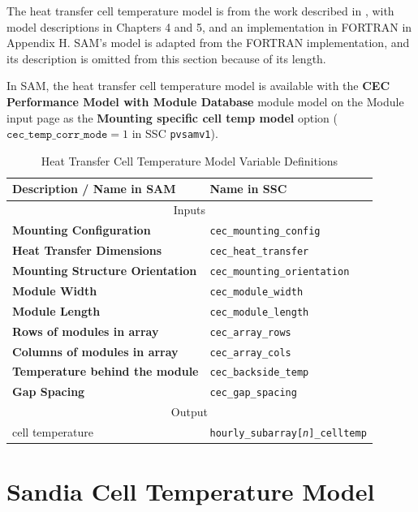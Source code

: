 \documentclass[12pt,letterpaper]{article}
\begin{document}
The heat transfer cell temperature model is from the work described in \citet{neises2011}, with model descriptions in Chapters 4 and 5, and an implementation in FORTRAN in Appendix H. SAM's model is adapted from the FORTRAN implementation, and its description is omitted from this section because of its length.

In SAM, the heat transfer cell temperature model is available with the \textbf{CEC Performance Model with Module Database} module model on the Module input page as the \textbf{Mounting specific cell temp model} option ($\mathtt{cec\_temp\_corr\_mode}=1$ in SSC \texttt{pvsamv1}).

\begin{table}
\begin{center}
\caption{Heat Transfer Cell Temperature Model Variable Definitions}
\begin{tabular}{ll}
\midrule
Description / \textbf{Name in SAM} & Name in SSC \\
\midrule
\multicolumn{2}{c}{Inputs}\\
\textbf{Mounting Configuration} & \texttt{cec\_mounting\_config} \\ 
\textbf{Heat Transfer Dimensions} & \texttt{cec\_heat\_transfer} \\ 
\textbf{Mounting Structure Orientation} & \texttt{cec\_mounting\_orientation} \\ 
\textbf{Module Width} & \texttt{cec\_module\_width} \\ 
\textbf{Module Length} & \texttt{cec\_module\_length} \\ 
\textbf{Rows of modules in array} & \texttt{cec\_array\_rows} \\ 
\textbf{Columns of modules in array} & \texttt{cec\_array\_cols} \\ 
\textbf{Temperature behind the module} & \texttt{cec\_backside\_temp} \\ 
\textbf{Gap Spacing} & \texttt{cec\_gap\_spacing} \\ 
\midrule
\multicolumn{2}{c}{Output}\\
cell temperature & \texttt{hourly\_subarray[\textit{n}]\_celltemp} \\
\hline
\end{tabular}
\label{tab-tempheattransfer}
\end{center}
\end{table}

\section{Sandia Cell Temperature Model}\label{sec-tcsandia}
\end{document}
